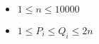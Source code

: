\begin{itemize}
	\tightlist
	\item $1 \le n \le 10000$
	\item $1 \le P_i \le Q_i \le 2n$
\end{itemize}
